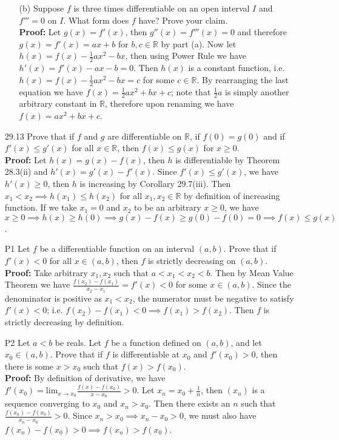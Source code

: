 \documentclass{article}
\begin{document}
\begin{itemize}
\begin{itemize}
              \item [(b)] Suppose $f$ is three times differentiable on an open interval $I$ and $f'''=0$ on $I$. What form does $f$ have? Prove your claim.\\\textbf{Proof: } Let $g(x)=f'(x)$, then $g''(x)=f'''(x)=0$ and therefore $g(x)=f'(x)=ax+b$ for $b,c\in\mathbb{R}$ by part (a). Now let $h(x)=f(x)-\frac{1}{2}ax^2-bx$, then using Power Rule we have $h'(x)=f'(x)-ax-b=0$. Then $h(x)$ is a constant function, i.e. $h(x)=f(x)-\frac{1}{2}ax^2-bx=c$ for some $c\in\mathbb{R}$. By rearranging the last equation we have $f(x)=\frac{1}{2}ax^2+bx+c$; note that $\frac{1}{2}a$ is simply another arbitrary constant in $\mathbb{R}$, therefore upon renaming we have $f(x)=ax^2+bx+c$.
          \end{itemize}
    \item [29.13] Prove that if $f$ and $g$ are differentiable on $\mathbb{R}$, if $f(0)=g(0)$ and if $f'(x)\leq g'(x)$ for all $x\in\mathbb{R}$, then $f(x)\leq g(x)$ for $x\geq 0$.\\\textbf{Proof: } Let $h(x)=g(x)-f(x)$, then $h$ is differentiable by Theorem 28.3(ii) and $h'(x)=g'(x)-f'(x)$. Since $f'(x)\leq g'(x)$, we have $h'(x)\geq 0$, then $h$ is increasing by Corollary 29.7(iii). Then $x_1<x_2\implies h(x_1)\leq h(x_2)$ for all $x_1,x_2\in\mathbb{R}$ by definition of increasing function. If we take $x_1=0$ and $x_2$ to be an arbitrary $x\geq 0$, we have $x\geq 0\implies h(x)\geq h(0)\implies g(x)-f(x)\geq g(0)-f(0)=0\implies f(x)\leq g(x)$.
    \item [P1] Let $f$ be a differentiable function on an interval $(a,b)$. Prove that if $f'(x)<0$ for all $x\in(a,b)$, then $f$ is strictly decreasing on $(a,b)$.\\\textbf{Proof: } Take arbitrary $x_1, x_2$ such that $a<x_1<x_2<b$. Then by Mean Value Theorem we have $\frac{f(x_2)-f(x_1)}{x_2-x_1}=f'(x)<0$ for some $x\in(a,b)$. Since the denominator is positive as $x_1<x_2$, the numerator must be negative to satisfy $f'(x)<0$; i.e. $f(x_2)-f(x_1)<0\implies f(x_1)>f(x_2)$. Then $f$ is strictly decreasing by definition.
    \item [P2] Let $a<b$ be reals. Let $f$ be a function defined on $(a,b)$, and let $x_0\in(a,b)$. Prove that if $f$ is differentiable at $x_0$ and $f'(x_0)>0$, then there is some $x>x_0$ such that $f(x)>f(x_0)$.\\\textbf{Proof: } By definition of derivative, we have $f'(x_0)=\text{lim}_{x\rightarrow x_0}\frac{f(x)-f(x_0)}{x-x_0}>0$. Let $x_n=x_0+\frac{1}{n}$, then $(x_n)$ is a sequence converging to $x_0$ and $x_n>x_0$. Then there exists an $n$ such that $\frac{f(x_n)-f(x_0)}{x_n-x_0}>0$. Since $x_n>x_0\implies x_n-x_0>0$, we must also have $f(x_n)-f(x_0)>0\implies f(x_n)>f(x_0)$.

\end{itemize}
\end{document}
